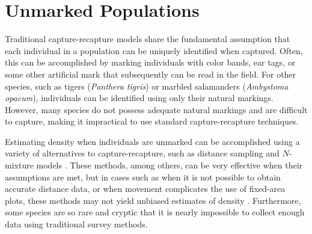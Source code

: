 \chapter{Unmarked Populations}
\label{chapt.scr-unmarked}

\vspace{0.3cm}

Traditional capture-recapture models share the fundamental
assumption that each individual in a population can be uniquely
identified when captured. Often, this can be accomplished
by marking individuals with color bands, ear tags, or some other
artificial mark that subsequently can be read in the field. For other
species, such as tigers (\textit{Panthera tigris}) or
marbled salamanders (\textit{Ambystoma opacum}),
individuals can be identified
using only their natural markings. However, many species
do not possess adequate natural markings and are
difficult to capture, making it impractical to use standard
capture-recapture techniques.

Estimating density when individuals are unmarked can be accomplished
using a variety of alternatives to capture-recapture, such as distance
sampling \citep{buckland_etal:2001} and $N$-mixture models
\citep{royle:2004biom}.
These methods, among others, can be
very effective when their assumptions are met, but in cases such as
when it is not possible to obtain accurate distance data, or when
movement complicates the use of fixed-area plots,
these methods may not yield unbiased estimates of density
\citep{chandler_etal:2011}.
Furthermore, some species are so rare and
cryptic that it is nearly impossible to collect enough data using
traditional survey methods.

